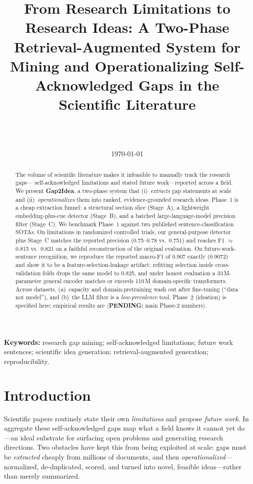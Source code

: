 \documentclass[10pt,a4paper]{article}
\title{\bfseries From Research Limitations to Research Ideas: A Two-Phase
Retrieval-Augmented System for Mining and Operationalizing Self-Acknowledged
Gaps in the Scientific Literature}
\author{\pending{Author 1, Author 2} \\ \small \pending{Department, University} \\
\small \pending{correspondence@email}}
\date{\today}
\newcommand{\pending}[1]{\textcolor{red!80!black}{$\langle$\textbf{PENDING:} #1$\rangle$}}
\newcommand{\done}[1]{\textcolor{green!45!black}{#1}}
\begin{document}
\maketitle

\begin{abstract}
The volume of scientific literature makes it infeasible to manually track the research gaps---
self-acknowledged limitations and stated future work---reported across a field. We present
\textbf{Gap2Idea}, a two-phase system that (i)~\emph{extracts} gap statements at scale and
(ii)~\emph{operationalizes} them into ranked, evidence-grounded research ideas. Phase~1 is a
cheap extraction funnel: a structural section slice (Stage~A), a lightweight embedding-plus-cue
detector (Stage~B), and a batched large-language-model precision filter (Stage~C). We benchmark
Phase~1 against two published sentence-classification SOTAs. On limitations in randomized
controlled trials, our general-purpose detector plus Stage~C \done{matches the reported
precision (0.75--0.78 vs.\ 0.751) and reaches F1 $\approx$ 0.815 vs.\ 0.821} on a faithful
reconstruction of the original evaluation. On future-work-sentence recognition, we \done{reproduce
the reported macro-F1 of 0.907 exactly (0.9072) and show it to be a feature-selection-leakage
artifact}: refitting selection inside cross-validation folds drops the same model to 0.825, and
under honest evaluation a 33\,M-parameter general encoder matches or exceeds 110\,M
domain-specific transformers. Across datasets, (a)~capacity and domain-pretraining wash out after
fine-tuning (``data not model''), and (b)~the LLM filter is a \emph{low-prevalence} tool.
Phase~2 (ideation) is specified here; empirical results are \pending{main Phase-2 numbers}.
\end{abstract}

\noindent\textbf{Keywords:} research gap mining; self-acknowledged limitations; future work
sentences; scientific idea generation; retrieval-augmented generation; reproducibility.

\section{Introduction}
Scientific papers routinely state their own \emph{limitations} and propose \emph{future work}.
In aggregate these self-acknowledged gaps map what a field knows it cannot yet do---an ideal
substrate for surfacing open problems and generating research directions. Two obstacles have
kept this from being exploited at scale: gaps must be \emph{extracted} cheaply from millions of
documents, and then \emph{operationalized}---normalized, de-duplicated, scored, and turned into
novel, feasible ideas---rather than merely summarized.
\end{document}
